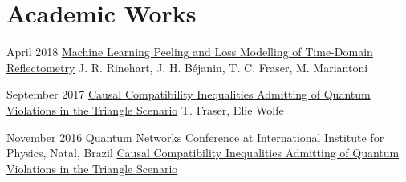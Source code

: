 \documentclass{article}
\begin{document}
    \section{Academic Works}
        {
            \begin{paperlist}
                \item{April 2018}
                {\href{https://arxiv.org/abs/1804.04756}{Machine Learning Peeling and Loss Modelling of Time-Domain Reflectometry}}
                {J. R. Rinehart, J. H. Béjanin, T. C. Fraser, M. Mariantoni}
                {}
                \item{September 2017}
                {\href{https://journals.aps.org/pra/abstract/10.1103/PhysRevA.98.022113}{Causal Compatibility Inequalities Admitting of Quantum Violations in the Triangle Scenario}}
                {T. Fraser, Elie Wolfe}
                {}
            \end{paperlist}
        }
        {
            \begin{academiclist}
                \item{November 2016}
                {Quantum Networks Conference at International Institute for Physics, Natal, Brazil}
                {\href{https://github.com/tcfraser/tcfraser.github.io/raw/master/documents/quantum_networks_brazil_2016.pdf}{Causal Compatibility Inequalities Admitting of Quantum Violations in the Triangle Scenario}}
            \end{academiclist}
        }
\end{document}
